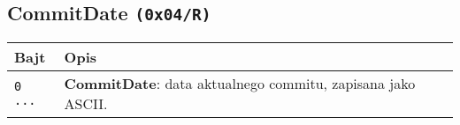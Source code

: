 \subsection{CommitDate \texttt{(0x04/R)}}
\label{CommitDate}
\begin{longtable}{|p{\BWIDTH}|p{\OWIDTH}|}
\hline
\textbf{Bajt} & \textbf{Opis}\\ 
\hline
\hline
\texttt{0 ...} & \textbf{CommitDate}: data aktualnego commitu, zapisana jako ASCII.\\
\hline
\end{longtable}